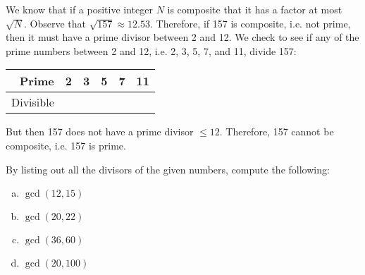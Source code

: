 \documentclass[11pt,letterpaper]{article}
\begin{document}
\sol We know that if a positive integer $N$ is composite that it has a factor at most $\sqrt{N}$. Observe that $\sqrt{157} \approx 12.53$. Therefore, if 157 is composite, i.e. not prime, then it must have a prime divisor between 2 and 12. We check to see if any of the prime numbers between 2 and 12, i.e. 2, 3, 5, 7, and 11, divide 157: \par
	\begin{table}[!ht]
	\centering
	\begin{tabular}{r|rrrrr}
	Prime & 2 & 3 & 5 & 7 & 11 \\ \hline
	Divisible & \xmark & \xmark & \xmark & \xmark & \xmark
	\end{tabular}
	\end{table} \par
But then 157 does not have a prime divisor $\leq 12$. Therefore, 157 cannot be composite, i.e. 157 is prime. 



\newpage



 By listing out all the divisors of the given numbers, compute the following:
	\begin{enumerate}[(a)]
	\item $\gcd(12, 15)$
	\item $\gcd(20, 22)$
	\item $\gcd(36, 60)$
	\item $\gcd(20, 100)$
	\end{enumerate} \pspace
\end{document}
